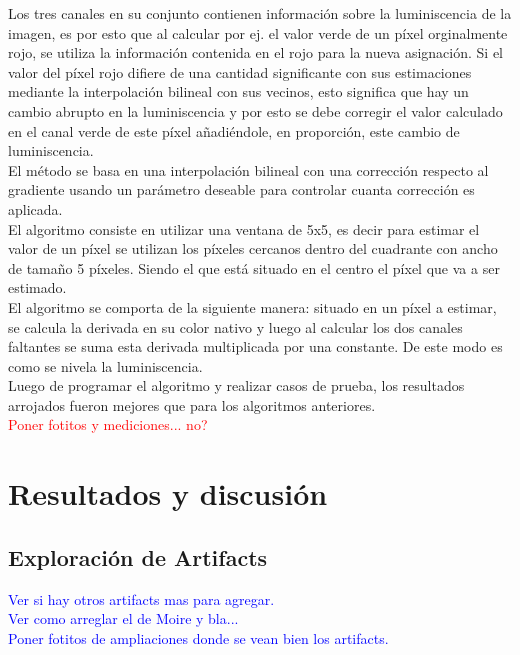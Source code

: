 \documentclass[a4paper]{article}
\begin{document}
Los tres canales en su conjunto contienen informaci\'on sobre la luminiscencia de la imagen, es por esto que al calcular por ej. el valor verde de un p\'ixel orginalmente rojo, se utiliza la informaci\'on contenida en el rojo para la nueva asignaci\'on. Si el valor del p\'ixel rojo difiere de una cantidad significante con sus estimaciones mediante la interpolaci\'on bilineal con sus vecinos, esto significa que hay un cambio abrupto en la luminiscencia y por esto se debe corregir el valor calculado en el canal verde de este p\'ixel a\~nadi\'endole, en proporci\'on, este cambio de luminiscencia.\\

El m\'etodo se basa en una interpolaci\'on bilineal con una correcci\'on respecto al gradiente usando un par\'ametro deseable para controlar cuanta correcci\'on es aplicada.\\

El algoritmo consiste en utilizar una ventana de 5x5, es decir para estimar el valor de un p\'ixel se utilizan los p\'ixeles cercanos dentro del cuadrante con ancho de tama\~no 5 p\'ixeles. Siendo el que est\'a situado en el centro el p\'ixel que va a ser estimado.\\

El algoritmo se comporta de la siguiente manera: situado en un p\'ixel a estimar, se calcula la derivada en su color nativo y luego al calcular los dos canales faltantes se suma esta derivada multiplicada por una constante. De este modo es como se nivela la luminiscencia.\\

Luego de programar el algoritmo y realizar casos de prueba, los resultados arrojados fueron mejores que para los algoritmos anteriores.\\

\textcolor{red}{Poner fotitos y mediciones... no?}\\




\newpage
\section{Resultados y discusi\'on}
\subsection{Exploraci\'on de Artifacts}

\textcolor{blue}{Ver si hay otros artifacts mas para agregar.\\
Ver como arreglar el de Moire y bla...\\
Poner fotitos de ampliaciones donde se vean bien los artifacts.}
\end{document}
